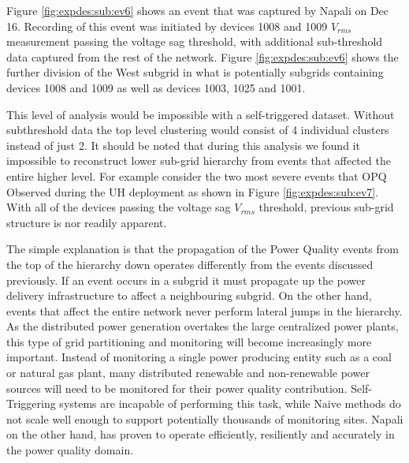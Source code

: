 Figure \ref{fig:expdes:sub:ev6} shows an event that was captured by Napali on Dec 16.
Recording of this event was initiated by devices 1008 and 1009 $V_{rms}$ measurement passing the voltage sag threshold, with additional sub-threshold data captured from the rest of the network.
Figure \ref{fig:expdes:sub:ev6} shows the further division of the West subgrid in what is potentially subgrids containing devices 1008 and 1009 as well as devices 1003, 1025 and 1001.

This level of analysis would be impossible with a self-triggered dataset.
Without subthreshold data the top level clustering would consist of 4 individual clusters instead of just 2.
It should be noted that during this analysis we found it impossible to reconstruct lower sub-grid  hierarchy from events that affected the entire higher level.
For example consider the two most severe events that OPQ Observed during the UH deployment as shown in Figure \ref{fig:expdes:sub:ev7}.
With all of the devices passing the voltage sag $V_{rms}$ threshold, previous sub-grid structure is nor readily apparent.

The simple explanation is that the propagation of the Power Quality events from the top of the hierarchy down operates differently from the events discussed previously.
If an event occurs in a subgrid it must propagate up the power delivery infrastructure to affect a neighbouring subgrid.
On the other hand, events that affect the entire network never perform lateral jumps in the hierarchy.
As the distributed power generation overtakes the large centralized power plants, this type of grid partitioning and monitoring will become increasingly more important.
Instead of monitoring a single power producing entity such as a coal or natural gas plant, many distributed renewable and non-renewable power sources will need to be monitored for their power quality contribution.
Self-Triggering systems are incapable of performing this task, while Naive methods do not scale well enough to support potentially thousands of monitoring sites.
Napali on the other hand, has proven to operate efficiently, resiliently and accurately in the power quality domain.


